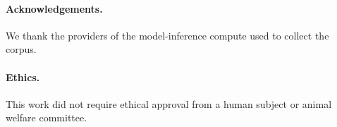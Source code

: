 \documentclass[11pt,a4paper]{article}
\begin{document}
%
%

\paragraph{Acknowledgements.} We thank the providers of the model-inference
compute used to collect the corpus.

\paragraph{Ethics.} This work did not require ethical approval from a human
subject or animal welfare committee.
\end{document}
